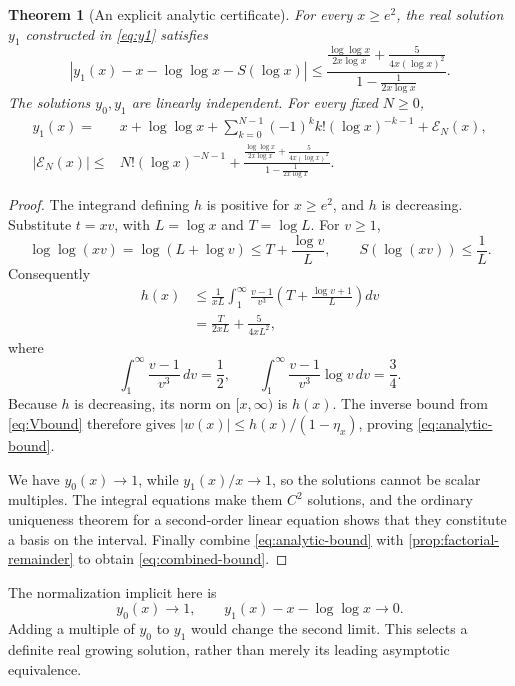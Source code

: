 \documentclass[11pt,a4paper]{article}
\numberwithin{equation}{section}
\newtheorem{theorem}{Theorem}[section]
\theoremstyle{definition}
\theoremstyle{remark}
\begin{document}
\begin{theorem}[An explicit analytic certificate]
\label{thm:analytic}
For every $x\ge e^2$, the real solution $y_1$ constructed in \eqref{eq:y1} satisfies
\begin{equation}
 \left|y_1(x)-x-\log\log x-S(\log x)\right|
 \le
 \frac{\displaystyle\frac{\log\log x}{2x\log x}
       +\displaystyle\frac5{4x(\log x)^2}}
 {\displaystyle1-\frac1{2x\log x}}.
 \label{eq:analytic-bound}
\end{equation}
The solutions $y_0,y_1$ are linearly independent. For every fixed $N\ge0$,
\begin{align}
 y_1(x)={}&x+\log\log x+
 \sum_{k=0}^{N-1}(-1)^kk!(\log x)^{-k-1}
 +\mathcal E_N(x),\\
 |\mathcal E_N(x)|\le{}&
 N!(\log x)^{-N-1}
 +\frac{\displaystyle\frac{\log\log x}{2x\log x}
       +\displaystyle\frac5{4x(\log x)^2}}
 {\displaystyle1-\frac1{2x\log x}}.
 \label{eq:combined-bound}
\end{align}
\end{theorem}
\begin{proof}
The integrand defining $h$ is positive for $x\ge e^2$, and $h$ is decreasing. Substitute $t=xv$, with $L=\log x$ and $T=\log L$. For $v\ge1$,
\[
 \log\log(xv)=\log(L+\log v)\le T+\frac{\log v}{L},
 \qquad S(\log(xv))\le\frac1L.
\]
Consequently
\begin{align*}
 h(x)&\le\frac1{xL}\int_1^\infty
 \frac{v-1}{v^3}\left(T+\frac{\log v+1}{L}\right)dv\\
 &=\frac{T}{2xL}+\frac5{4xL^2},
\end{align*}
where
\[
 \int_1^\infty\frac{v-1}{v^3}\,dv=\frac12,
 \qquad
 \int_1^\infty\frac{v-1}{v^3}\log v\,dv=\frac34.
\]
Because $h$ is decreasing, its norm on $[x,\infty)$ is $h(x)$. The inverse bound from \eqref{eq:Vbound} therefore gives $|w(x)|\le h(x)/(1-\eta_x)$, proving \eqref{eq:analytic-bound}.

We have $y_0(x)\to1$, while $y_1(x)/x\to1$, so the solutions cannot be scalar multiples. The integral equations make them $C^2$ solutions, and the ordinary uniqueness theorem for a second-order linear equation shows that they constitute a basis on the interval. Finally combine \eqref{eq:analytic-bound} with \cref{prop:factorial-remainder} to obtain \eqref{eq:combined-bound}.
\end{proof}

The normalization implicit here is
\[
 y_0(x)\to1,\qquad y_1(x)-x-\log\log x\to0.
\]
Adding a multiple of $y_0$ to $y_1$ would change the second limit. This selects a definite real growing solution, rather than merely its leading asymptotic equivalence.
\end{document}
